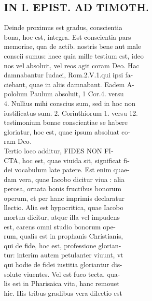 \documentclass{article}
\begin{document}
\begin{pages}
\section*{IN I. EPIST. AD TIMOTH. \\
                }Deinde proximus est gradus, conscientia \\
                bona, hoc est, integra. Est conscientia pars \\
                memoriae, qua de actib. nostris bene aut male \\
                conscii sumus: haec quia mille testium est, ideo \\
                nos vel absoluit, vel reos agit coram Deo. Hac \\
                damnabantur Iudaei, Rom.2.V.1.qui ipsi fa- \\
                ciebant, quae in aliis damnabant. Eadem A- \\
                pololum Paulum absoluit, 1 Cor.4. versu \\
                4. Nullius mihi conscius sum, sed in hoc non \\
                iustificatus sum. 2. Corinthiorum 1. versu 12. \\
                testimonium bonae conscientiae se habere \\
                gloriatur, hoc est, quae ipsum absoluat co- \\
                ram Deo. \\
                Tertio loco additur, FIDES NON FI- \\
                CTA, hoc est, quae viuida sit, significat fi- \\
                dei vocabulum late patere. Est enim quae- \\
                dam vera, quae Iacobo dicitur viua : alia \\
                perosa, ornata bonis fructibus bonorum \\
                operum, et per hanc imprimis declaratur \\
                llectio. Alia est hypocritica, quae Iacobo \\
                mortua dicitur, atque illa vel impudens \\
                est, carens omni studio bonorum ope- \\
                rum, qualis est in prophanis Christianis, \\
                qui de fide, hoc est, professione glorian- \\
                tur: interim autem petulanter viuunt, vt \\
                qui hodie de fidei iustitia gloriantur dis- \\
                solute viuentes. Vel est fuco tecta, qua- \\
                lis est in Pharisaica vita, hanc remouet \\
                hic. His tribus gradibus vera dilectio est \\
                

\end{pages}
\end{document}
